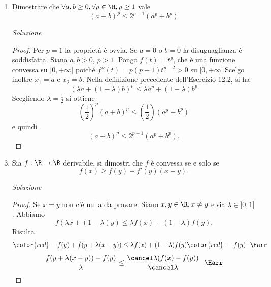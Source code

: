 \documentclass{article}
\begin{document}
\begin{enumerate}[label=\textbf{Esercizio 12.\arabic*.},itemindent=*]
\begin{proof}
    \[f(\lambda x_1+(1-\lambda)x_2)<\lambda f(x_1)+(1-\lambda)f(x_2)~~~~~\forall \lambda \in [0,1]\quad \forall x_1,x_2\in \R, x_1\neq x_2. \]
    Osserviamo che 
    \[(\lambda x_1+(1-\lambda)x_2)^2<\lambda x_1^2+(1-\lambda)x^2_2~~\Harr\]
    \[x_1^2\lambda(\lambda-1)+x_2^2((1-\lambda)^2-(1-\lambda))+2\lambda(1-\lambda)x_1x_2<0~~\Harr\]
    \[\lambda(\lambda-1)[x_1^2+x_2^2-2x_1x_2]<0\]
    \[\lambda(\lambda-1)(x_1-x_2)^2 < 0\]
    che è verificato $\forall \lambda \in ]0,1[, \forall x_1,x_2\in \R, x\neq x_1$.
\end{proof}
\item Dimostrare che $\forall a,b\geq 0, \forall p\in\R, p\geq 1$ vale
\[(a+b)^p\leq 2^{p-1}(a^p+b^p)\]
\item[\textit{\large Soluzione~}]~
\begin{proof} 
    Per $p=1$ la proprietà è ovvia. Se $a=0$ o $b=0$ la disuguaglianza è soddisfatta. Siano $a,b>0$, $p>1$. Pongo $f(t)=t^p$, che è una funzione convessa su $[0,+\infty[$ poiché $f''(t)=p(p-1)t^{p-2}>0$ su $]0,+\infty[$.Scelgo inoltre $x_1=a$ e $x_2=b$. Nella definizione precedente dell'Esercizio 12.2, si ha 
    \[(\lambda a +(1-\lambda)b)^p\leq \lambda a^p+(1-\lambda)b^p\]
    Scegliendo $\lambda=\frac{1}{2}$ si ottiene
    \[\left( \frac{1}{2} \right)^p(a+b)^p\leq \left( \frac{1}{2} \right)(a^p+b^p)\]
    e quindi
    \[(a+b)^p\leq 2^{p-1}(a^p+b^p).\]
\end{proof}
\item Sia $f:\R\to\R$ derivabile, si dimostri che $f$ è convessa se e solo se \[f(x)\geq f(y)+f'(y)(x-y).\]
\item[\textit{\large Soluzione~}]~
\begin{proof}
    Se $x=y$ non c'è nulla da provare. Siano $x,y\in \R, x\neq y$ e sia $\lambda\in ]0,1]$. Abbiamo 
    \[f(\lambda x +(1 -\lambda )y)\leq \lambda f(x) + (1 -\lambda)f(y).\]
    Risulta
    \[ {\color{red}- f(y)} + f(y +\lambda(x - y))\leq \lambda f(x) +(1 -\lambda)f(y){\color{red}\, -\, f(y)}~ ~ \Harr\]
    \[\frac{f(y +\lambda(x - y))- f(y)}{\lambda} \leq \frac{\cancel\lambda (f(x) - f(y))}{\cancel\lambda}~ ~ \Harr\]

\end{proof}
\end{enumerate}
\end{document}

